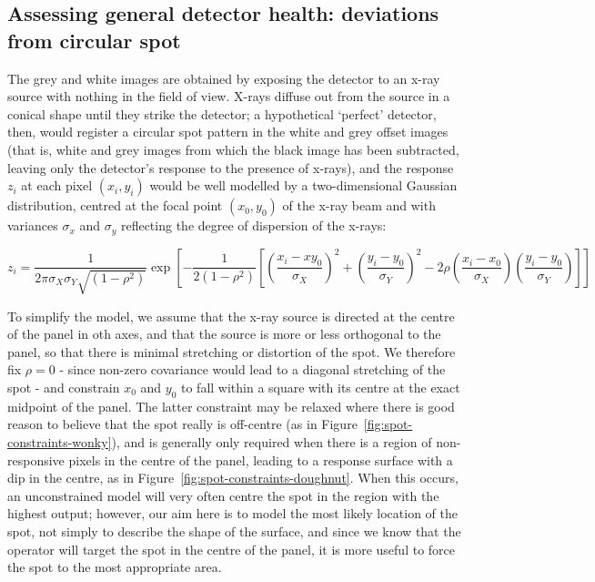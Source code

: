 \documentclass[\main/IO-Pixels.tex]{subfiles}
\begin{document}

\subsection{Assessing general detector health: deviations from circular spot}

The grey and white images are obtained by exposing the detector to an x-ray source with nothing in the field of view. X-rays diffuse out from the source in a conical shape until they strike the detector; a hypothetical `perfect' detector,  then, would register a circular spot pattern in the white and grey offset images (that is, white and grey images from which the black image has been subtracted, leaving only the detector's response to the presence of x-rays), and the response $z_i$ at each pixel $(x_i, y_i)$ would be well modelled by a two-dimensional Gaussian distribution, centred at the focal point $(x_0, y_0)$ of the x-ray beam and with variances $\sigma_x$ and $\sigma_y$ reflecting the degree of dispersion of the x-rays:

\[ z_i = \frac{1}{2\pi \sigma_X \sigma_Y \sqrt{(1-\rho^2)}} \exp \left[ -\frac{1}{2(1-\rho^2)} \left[ \left(\frac{x_i-xy_0}{\sigma_X}\right)^2 + \left(\frac{y_i-y_0}{\sigma_Y}\right)^2 - 2\rho\left(\frac{x_i-x_0}{\sigma_X} \right) \left(\frac{y_i-y_0}{\sigma_Y} \right) \right] \right] \]

To simplify the model, we assume that the x-ray source is directed at the centre of the panel in oth axes, and that the source is more or less orthogonal to the panel, so that there is minimal stretching or distortion of the spot. We therefore fix $\rho = 0$ - since non-zero covariance would lead to a diagonal stretching of the spot - and constrain $x_0$ and $y_0$ to fall within a square with its centre at the exact midpoint of the panel. The latter constraint may be relaxed where there is good reason to believe that the spot really is off-centre (as in Figure~\ref{fig:spot-constraints-wonky}), and is generally only required when there is a region of non-responsive pixels in the centre of the panel, leading to a response surface with a dip in the centre, as in Figure~\ref{fig:spot-constraints-doughnut}. When this occurs, an unconstrained model will very often centre the spot in the region with the highest output; however, our aim here is to model the most likely location of the spot, not simply to describe the shape of the surface, and since we know that the operator will target the spot in the centre of the panel, it is more useful to force the spot to the most appropriate area. 
\end{document}
